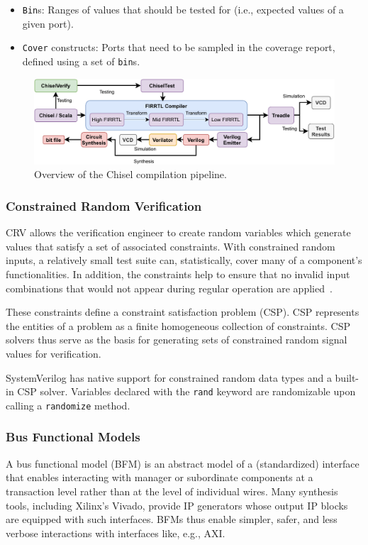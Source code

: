 \documentclass[conference]{IEEEtran}
\begin{document}
\begin{itemize}
  \item \texttt{Bin}s: Ranges of values that should be tested for (i.e., expected values of a given port).
  \item \texttt{Cover} constructs: Ports that need to be sampled in the coverage report, defined using a set of \texttt{bin}s.
\end{itemize}

\begin{figure}
  \centering
    \includegraphics[width=0.8\linewidth]{Chisel_FIRRTL_VERILOG.pdf}
    \caption{Overview of the Chisel compilation pipeline.}
\label{fig:chisel-pipe}
\end{figure}

\subsubsection{Constrained Random Verification}
CRV allows the verification engineer to create random variables which generate values that satisfy a set of associated constraints.
With constrained random inputs, a relatively small test suite can, statistically, cover many of a component's functionalities. 
In addition, the constraints help to ensure that no invalid input combinations that would not appear during regular operation are applied~\cite{MehtaCRV2018}.

These constraints define a constraint satisfaction problem (CSP).
CSP represents the entities of a problem as a finite homogeneous collection of constraints. 
CSP solvers thus serve as the basis for generating sets of constrained random signal values for verification.

SystemVerilog has native support for constrained random data types and a built-in CSP solver. 
Variables declared with the \texttt{rand} keyword are randomizable upon calling a \texttt{randomize} method.

\subsubsection{Bus Functional Models}
A bus functional model (BFM) is an abstract model of a (standardized) interface that enables interacting with manager or subordinate components at a transaction level rather than at the level of individual wires.
Many synthesis tools, including Xilinx's Vivado, provide IP generators whose output IP blocks are equipped with such interfaces. 
BFMs thus enable simpler, safer, and less verbose interactions with interfaces like, e.g., AXI.
\end{document}
